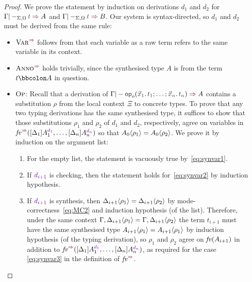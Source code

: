 \begin{proof}%
  We prove the statement by induction on derivations $d_1$ and $d_2$ for $\Gamma |-_{\Sigma, \Omega} \isTerm{t} \syn A$ and $\Gamma |-_{\Sigma, \Omega} \isTerm{t} \syn B$.
  Our system is syntax-directed, so $d_1$ and $d_2$ must be derived from the same rule: 
  \begin{itemize}
    \item $\SynRule{Var}$ follows from that each variable as a raw term refers to the same variable in its context.
    \item $\SynRule{Anno}$ holds trivially, since the synthesised type $A$ is from the term $t \annotate A$ in question.
    \item $\textnormal{\textsc{Op}}$: Recall that a derivation of\/ $\Gamma |- \tmOpts \syn A$ contains a substitution $\rho$ from the local context $\Xi$ to concrete types.
      To prove that any two typing derivations has the same synthesised type, it suffices to show that those substitutions $\rho_1$ and $\rho_2$ of $d_1$ and $d_2$, respectively, agree on variables in $\synvar(\biargs)$ so that ${A_0}\!\left<{\rho_1}\right> = {A_0}\!\left<{\rho_2}\right>$.
      We prove it by induction on the argument list:
      \begin{enumerate}
        \item For the empty list, the statement is vacuously true by~\eqref{eq:synvar1}.
        \item If $\dir{d_{i+1}}$ is checking, then the statement holds for~\eqref{eq:synvar2} by induction hypothesis.
        \item If $\dir{d_{i+1}}$ is synthesis, then ${\Delta_{i+1}}\!\left<{\rho_1}\right> = {\Delta_{i+1}}\!\left<{\rho_2}\right>$ by mode-correctness~\eqref{eq:MC2} and induction hypothesis (of the list).
          Therefore, under the same context $\Gamma, {\Delta_{i+1}}\!\left<{\rho_1}\right> = \Gamma, {\Delta_{i+1}}\!\left<{\rho_2}\right>$ the term $t_{i+1}$ must have the same synthesised type ${A_{i+1}}\!\left<{\rho_1}\right> = {A_{i+1}}\!\left<{\rho_1}\right>$ by induction hypothesis (of the typing derivation), so $\rho_1$ and $\rho_2$ agree on $\mathit{fv}(A_{i+1})$ in addition to $\synvar(\biargs)$, as required for the case \eqref{eq:synvar3} in the definition of $\synvar$.
      \end{enumerate}
  \end{itemize}
\end{proof}



